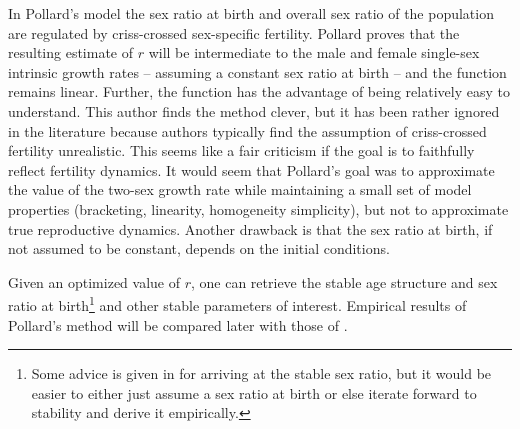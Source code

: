 In Pollard's model the sex ratio at birth and overall sex ratio
of the population are regulated by criss-crossed sex-specific fertility. Pollard
proves that the resulting estimate of $r$ will be intermediate to the male and female
single-sex intrinsic growth rates -- assuming a constant sex ratio at birth --
and the function remains linear. Further, the function has the advantage of being 
relatively easy to understand.
This author finds the method clever, but it has been rather ignored in the
literature because authors typically find the assumption of criss-crossed
fertility unrealistic. This seems like a fair criticism if the goal is to
faithfully reflect fertility dynamics. It would seem that Pollard's goal 
was to approximate the value of the two-sex growth rate while maintaining
a small set of model properties (bracketing, linearity, homogeneity
simplicity), but not to approximate true reproductive dynamics. Another drawback
is that the sex ratio at birth, if not assumed to be constant, depends on the
initial conditions. 

Given an optimized value of $r$, one can retrieve the stable age structure and
sex ratio at birth\footnote{Some advice is given in
\citet{pollard1948measurement} for arriving at the stable sex ratio, but it
would be easier to either just assume a sex ratio at birth or else iterate
forward to stability and derive it empirically.} and other stable parameters of
interest. Empirical results of Pollard's method will be compared later with
those of \citet{mitra1978derivation}.
